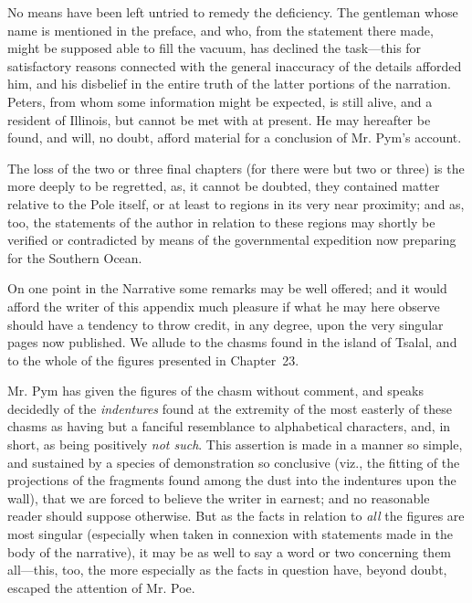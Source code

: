 No means have been left untried to remedy the deficiency. The gentleman whose
name is mentioned in the preface, and who, from the statement there made, might
be supposed able to fill the vacuum, has declined the task---this for
satisfactory reasons connected with the general inaccuracy of the details
afforded him, and his disbelief in the entire truth of the latter portions of
the narration. Peters, from whom some information might be expected, is still
alive, and a resident of Illinois, but cannot be met with at present. He may
hereafter be found, and will, no doubt, afford material for a conclusion of Mr.
Pym's account. 

The loss of the two or three final chapters (for there were but two or three)
is the more deeply to be regretted, as, it cannot be doubted, they contained
matter relative to the Pole itself, or at least to regions in its very near
proximity; and as, too, the statements of the author in relation to these
regions may shortly be verified or contradicted by means of the governmental
expedition now preparing for the Southern Ocean. 

On one point in the Narrative some remarks may be well offered; and it would
afford the writer of this appendix much pleasure if what he may here observe
should have a tendency to throw credit, in any degree, upon the very singular
pages now published. We allude to the chasms found in the island of Tsalal, and
to the whole of the figures presented in Chapter~23. 

Mr. Pym has given the figures of the chasm without comment, and speaks
decidedly of the \emph{indentures} found at the extremity of the most easterly
of these chasms as having but a fanciful resemblance to alphabetical characters,
and, in short, as being positively \emph{not such}. This assertion is made in a
manner so simple, and sustained by a species of demonstration so conclusive
(viz., the fitting of the projections of the fragments found among the dust into
the indentures upon the wall), that we are forced to believe the writer in
earnest; and no reasonable reader should suppose otherwise. But as the facts in
relation to \emph{all} the figures are most singular (especially when taken in
connexion with statements made in the body of the narrative), it may be as well
to say a word or two concerning them all---this, too, the more especially as the
facts in question have, beyond doubt, escaped the attention of Mr. Poe. 

